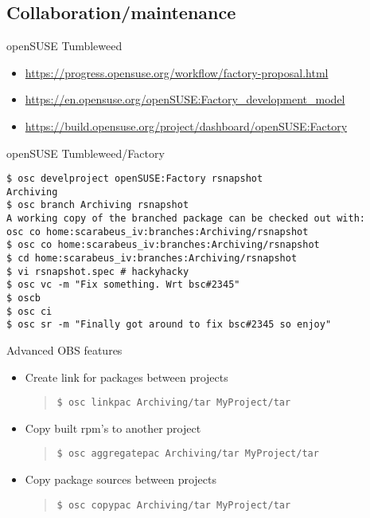 \documentclass{beamer}
\begin{document}
\subsection{Collaboration/maintenance}

\begin{frame}{openSUSE Tumbleweed}
	\begin{itemize}
	\item{\url{https://progress.opensuse.org/workflow/factory-proposal.html}}
	\item{\url{https://en.opensuse.org/openSUSE:Factory\_development\_model}}
	\item{\url{https://build.opensuse.org/project/dashboard/openSUSE:Factory}}
	\end{itemize}
\end{frame}

\begin{frame}[fragile]{openSUSE Tumbleweed/Factory}
	\begin{small}
	\begin{verbatim}
$ osc develproject openSUSE:Factory rsnapshot
Archiving
$ osc branch Archiving rsnapshot
A working copy of the branched package can be checked out with:
osc co home:scarabeus_iv:branches:Archiving/rsnapshot
$ osc co home:scarabeus_iv:branches:Archiving/rsnapshot
$ cd home:scarabeus_iv:branches:Archiving/rsnapshot
$ vi rsnapshot.spec # hackyhacky
$ osc vc -m "Fix something. Wrt bsc#2345"
$ oscb
$ osc ci
$ osc sr -m "Finally got around to fix bsc#2345 so enjoy"
	\end{verbatim}
	\end{small}
\end{frame}


\begin{frame}[fragile]{Advanced OBS features}
  \begin{itemize}
    \item Create link for packages between projects 
      \begin{quote}
        \begin{verbatim}$ osc linkpac Archiving/tar MyProject/tar\end{verbatim}
      \end{quote}
    \item Copy built rpm's to another project
      \begin{quote}
        \begin{verbatim}$ osc aggregatepac Archiving/tar MyProject/tar\end{verbatim}
      \end{quote}
    \item Copy package sources between projects
      \begin{quote}
        \begin{verbatim}$ osc copypac Archiving/tar MyProject/tar\end{verbatim}
      \end{quote}
  \end{itemize}
\end{frame}
\end{document}
